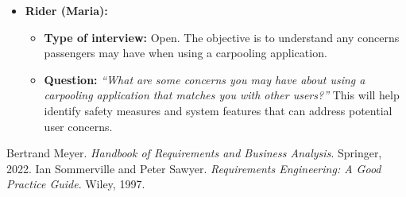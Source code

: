 \documentclass[12pt,letterpaper]{article}
\begin{document}
\begin{itemize}
    \item \textbf{Rider (Maria):}
    \begin{itemize}
        \item \textbf{Type of interview:} Open. The objective is to understand any concerns passengers may have when using a carpooling application.
        \item \textbf{Question:} \textit{“What are some concerns you may have about using a carpooling application that matches you with other users?”}  
        This will help identify safety measures and system features that can address potential user concerns.
    \end{itemize}
\end{itemize}

\clearpage

\begin{thebibliography}{9}
 Bertrand Meyer. \textit{Handbook of Requirements and Business Analysis}. Springer, 2022.
 Ian Sommerville and Peter Sawyer. \textit{Requirements Engineering: A Good Practice Guide}. Wiley, 1997.
\end{thebibliography}
\end{document}
